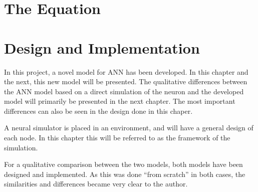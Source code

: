 \documentclass[a4paper,11 pt]{report}
\begin{document}





\chapter{The Equation} 				%


\chapter{Design and Implementation} %
	In this project, a novel model for ANN has been developed.  %
	In this chapter and the next, this new model will be presented.  %
	The qualitative differences between the ANN model based on a direct simulation of the neuron and the developed model will primarily be presented in the next chapter.
	The most important differences can also be seen in the design done in this chaper. %

	A neural simulator is placed in an environment, and will have a general design of each node. 
	In this chapter this will be referred to as the framework of the simulation.
	
	For a qualitative comparison between the two models, both models have been designed and implemented. %
	As this was done ``from scratch'' in both cases, the similarities and differences became very clear to the author. %
\end{document}
